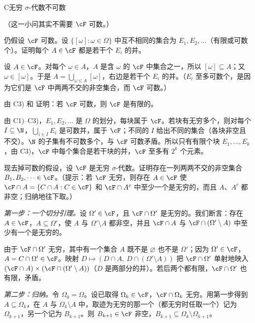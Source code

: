\begin{probleme}{C}{无穷 $\sigma$-代数不可数}
\begin{questions}
\begin{solution}
（这一小问其实不需要 $\cF$ 可数。）
\end{solution}
\item 仍假设 $\cF$ 可数。设 $\{[\omega]:\omega\in\Omega\}$ 中互不相同的集合为 $E_1,E_2,\dots$（有限或可数个）。证明每个 $A\in\cF$ 都是若干个 $E_i$ 的并。
\begin{solution}
设 $A\in\cF$。对每个 $\omega\in A$，$A$ 是含 $\omega$ 的 $\cF$ 中集合之一，所以 $[\omega]\subseteq A$；又 $\omega\in[\omega]$。于是 $A=\bigcup_{\omega\in A}[\omega]$，右边是若干个 $E_i$ 的并。（$E_i$ 至多可数个，是因为它们是 $\cF$ 中两两不交的非空集合，而 $\cF$ 可数。）
\end{solution}
\item 由 C3) 和 证明：若 $\cF$ 可数，则 $\cF$ 是有限的。
\begin{solution}
由 C1)–C3)，$E_1,E_2,\dots$ 是 $\Omega$ 的划分，每块属于 $\cF$。若块有无穷多个，则对每个 $I\subseteq\N$，$\bigcup_{i\in I}E_i$ 是可数并，属于 $\cF$；不同的 $I$ 给出不同的集合（各块非空且不交）。$\N$ 的子集有不可数多个，与 $\cF$ 可数矛盾。所以只有有限个块 $E_1,\dots,E_k$，由 C3)，$\cF$ 中每个集合是若干块的并，$\cF$ 至多有 $2^k$ 个元素。
\end{solution}
\item 现去掉可数的假设，设 $\cF$ 是无穷 $\sigma$-代数。证明存在一列两两不交的非空集合 $B_1,B_2,\dots\in\cF$。（提示：若 $\cF$ 无穷，则存在 $A\in\cF$ 使 $\cF\cap A=\{C\cap A: C\in\cF\}$ 和 $\cF\cap A^c$ 中至少一个是无穷的，而且 $A$、$A^c$ 都非空；归纳地往下取。）
\begin{solution}
\emph{第一步：一个切分引理。}设 $\Omega'\in\cF$，且 $\cF\cap\Omega'$ 是无穷的。我们断言：存在 $A\in\cF$，$A\subseteq\Omega'$，使 $A$ 与 $\Omega'\setminus A$ 都非空，并且 $\cF\cap A$ 与 $\cF\cap(\Omega'\setminus A)$ 中至少有一个是无穷的。

由于 $\cF\cap\Omega'$ 无穷，其中有一个集合 $A$ 既不是 $\varnothing$ 也不是 $\Omega'$；因为 $\Omega'\in\cF$，$A=C\cap\Omega'\in\cF$。映射 $D\mapsto(D\cap A,\ D\cap(\Omega'\setminus A))$ 把 $\cF\cap\Omega'$ 单射地映入 $(\cF\cap A)\times(\cF\cap(\Omega'\setminus A))$（$D$ 是两部分的并）。若后两个都有限，$\cF\cap\Omega'$ 也有限，矛盾。

\emph{第二步：归纳。}令 $\Omega_0=\Omega$。设已取得 $\Omega_k\in\cF$，$\cF\cap\Omega_k$ 无穷。用第一步得到 $A\subseteq\Omega_k$，在 $A$ 与 $\Omega_k\setminus A$ 中，取迹为无穷的那一个（都无穷时任取一个）记为 $\Omega_{k+1}$，另一个记为 $B_{k+1}$。则 $B_{k+1}\in\cF$ 非空，$B_{k+1}\subseteq\Omega_k\setminus\Omega_{k+1}$。


\end{solution}
\end{questions}
\end{probleme}
